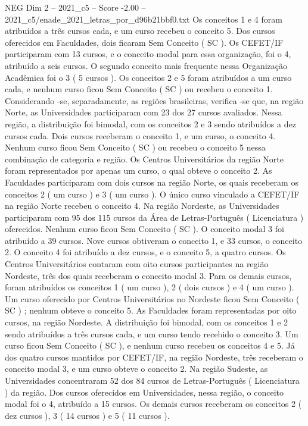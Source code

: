\begin{textsample}{NEG Dim 2 – 2021\_c5 – Score -2.00 – 2021\_c5/enade\_2021\_letras\_por\_d96b21bbf0.txt}
Os conceitos 1 e 4 foram atribuídos a três cursos cada, e um curso recebeu o conceito 5.
Dos cursos oferecidos em Faculdades, dois ficaram Sem Conceito ( SC ).
Os CEFET/IF participaram com 13 cursos, e o conceito modal para essa organização, foi o 4, atribuído a seis cursos.
O segundo conceito mais frequente nessa Organização Acadêmica foi o 3 ( 5 cursos ).
Os conceitos 2 e 5 foram atribuídos a um curso cada, e nenhum curso ficou Sem Conceito ( SC ) ou recebeu o conceito 1.
Considerando -se, separadamente, as regiões brasileiras, verifica -se que, na região Norte, as Universidades participaram com 23 dos 27 cursos avaliados.
Nessa região, a distribuição foi bimodal, com os conceitos 2 e 3 sendo atribuídos a dez cursos cada.
Dois cursos receberam o conceito 1, e um curso, o conceito 4.
Nenhum curso ficou Sem Conceito ( SC ) ou recebeu o conceito 5 nessa combinação de categoria e região.
Os Centros Universitários da região Norte foram representados por apenas um curso, o qual obteve o conceito 2.
As Faculdades participaram com dois cursos na região Norte, os quais receberam os conceitos 2 ( um curso ) e 3 ( um curso ).
O único curso vinculado a CEFET/IF na região Norte recebeu o conceito 4.
Na região Nordeste, as Universidades participaram com 95 dos 115 cursos da Área de Letras-Português ( Licenciatura ) oferecidos.
Nenhum curso ficou Sem Conceito ( SC ).
O conceito modal 3 foi atribuído a 39 cursos.
Nove cursos obtiveram o conceito 1, e 33 cursos, o conceito 2.
O conceito 4 foi atribuído a dez cursos, e o conceito 5, a quatro cursos.
Os Centros Universitários contaram com oito cursos participantes na região Nordeste, três dos quais receberam o conceito modal 3.
Para os demais cursos, foram atribuídos os conceitos 1 ( um curso ), 2 ( dois cursos ) e 4 ( um curso ).
Um curso oferecido por Centros Universitários no Nordeste ficou Sem Conceito ( SC ) ; nenhum obteve o conceito 5.
As Faculdades foram representadas por oito cursos, na região Nordeste.
A distribuição foi bimodal, com os conceitos 1 e 2 sendo atribuídos a três cursos cada, e um curso tendo recebido o conceito 3.
Um curso ficou Sem Conceito ( SC ), e nenhum curso recebeu os conceitos 4 e 5.
Já dos quatro cursos mantidos por CEFET/IF, na região Nordeste, três receberam o conceito modal 3, e um curso obteve o conceito 2.
Na região Sudeste, as Universidades concentraram 52 dos 84 cursos de Letras-Português ( Licenciatura ) da região.
Dos cursos oferecidos em Universidades, nessa região, o conceito modal foi o 4, atribuído a 15 cursos.
Os demais cursos receberam os conceitos 2 ( dez cursos ), 3 ( 14 cursos ) e 5 ( 11 cursos ).

\end{textsample}
